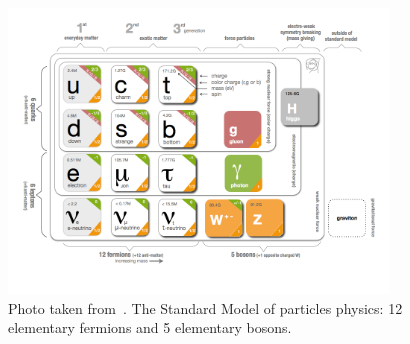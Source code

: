 \begin{figure}[!htb]
    \centering
    \captionsetup{justification=justified}
    \includegraphics[width=0.9\textwidth]{pics/Intro/standard_model_cern.png}
    \caption{Photo taken from~\cite{SM_table_CERN}. 
             The Standard Model of particles physics: 12 elementary fermions and 5 elementary bosons.}
    \label{fig:SM_table}
\end{figure}

